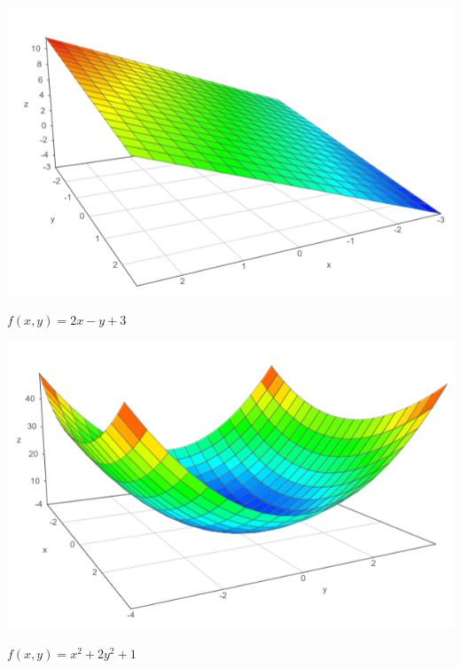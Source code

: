 \documentclass[11pt,a4paper]{article}
\theoremstyle{exostyle}
\begin{document}
\begin{center}
	\small
	\begin{minipage}{0.45\textwidth}
			\center			
			
	\includegraphics[scale=0.3]{figures-exercices/fpv-fiche1-exo3-fig1}	

	$f(x,y) = 2x - y + 3$		
	\end{minipage}
	\begin{minipage}{0.45\textwidth}
				\center		
				
	\includegraphics[scale=0.3]{figures-exercices/fpv-fiche1-exo3-fig2}	
	
	$f(x,y) = x^2 + 2y^2+1$
    \end{minipage}	
\end{center}
\end{document}
